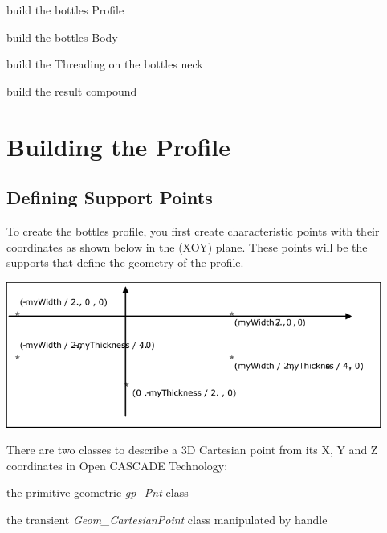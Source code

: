 \begin{DoxyItemize}
\item build the bottle\textquotesingle{}s Profile
\item build the bottle\textquotesingle{}s Body
\item build the Threading on the bottle\textquotesingle{}s neck
\item build the result compound
\end{DoxyItemize}\hypertarget{occt__tutorial_sec2}{}\section{Building the Profile}\label{occt__tutorial_sec2}
\hypertarget{occt__tutorial_OCCT_TUTORIAL_SUB2_1}{}\subsection{Defining Support Points}\label{occt__tutorial_OCCT_TUTORIAL_SUB2_1}
To create the bottle\textquotesingle{}s profile, you first create characteristic points with their coordinates as shown below in the (X\+OY) plane. These points will be the supports that define the geometry of the profile.


\begin{DoxyImageNoCaption}
\begin{center}
   \mbox{\includegraphics[width=466]{tutorial_image003.pdf}}
\end{center}
\end{DoxyImageNoCaption}


There are two classes to describe a 3D Cartesian point from its X, Y and Z coordinates in Open C\+A\+S\+C\+A\+DE Technology\+:


\begin{DoxyItemize}
\item the primitive geometric {\itshape gp\+\_\+\+Pnt} class
\item the transient {\itshape Geom\+\_\+\+Cartesian\+Point} class manipulated by handle
\end{DoxyItemize}


